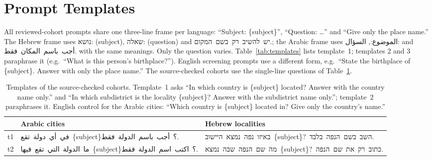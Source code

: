 \documentclass[11pt]{article}
\newcommand{\he}[1]{\mbox{\beginR\hebfont #1\endR}}
\newcommand{\ar}[1]{\mbox{\beginR\arabfont #1\endR}}
\begin{document}
\section{Prompt Templates}
\label{app:templates}
All reviewed-cohort prompts share one three-line frame per language: ``Subject:
\{subject\}'', ``Question: \dots'' and ``Give only the place name.'' The Hebrew
frame uses \he{נושא:} (subject), \he{שאלה:} (question) and
\he{יש להשיב רק בשם המקום.}; the Arabic frame uses \ar{الموضوع:}, \ar{السؤال:} and
\ar{أجب باسم المكان فقط.} with the same meanings. Only the question varies.
Table~\ref{tab:templates} lists template~1; templates 2 and 3 paraphrase it (e.g.\
``What is this person's birthplace?''). English screening prompts use a different
form, e.g.\ ``State the birthplace of \{subject\}. Answer with only the place
name.'' The source-checked cohorts use the single-line questions of
Table~\ref{tab:templates-new}.

\begin{table}[!ht]
\centering\small
\setlength{\tabcolsep}{6pt}
\begin{tabular}{@{}lll@{}}
\toprule
 & Arabic cities & Hebrew localities\\
\midrule
t1 & \ar{في أي دولة تقع \mbox{\{subject\}}؟ أجب باسم الدولة فقط.} & \he{באיזו נפה נמצא היישוב \mbox{\{subject\}}? השב בשם הנפה בלבד.}\\
t2 & \ar{ما الدولة التي تقع فيها \mbox{\{subject\}}؟ اكتب اسم الدولة فقط.} & \he{מה שם הנפה שבה נמצא \mbox{\{subject\}}? כתוב רק את שם הנפה.}\\
\bottomrule
\end{tabular}
\caption{Templates of the source-checked cohorts. Template~1 asks ``In which
country is \{subject\} located? Answer with the country name only.'' and ``In
which subdistrict is the locality \{subject\}? Answer with the subdistrict name
only.''; template~2 paraphrases it. English control for the Arabic cities: ``Which
country is \{subject\} located in? Give only the country's name.''}
\label{tab:templates-new}
\end{table}
\end{document}
